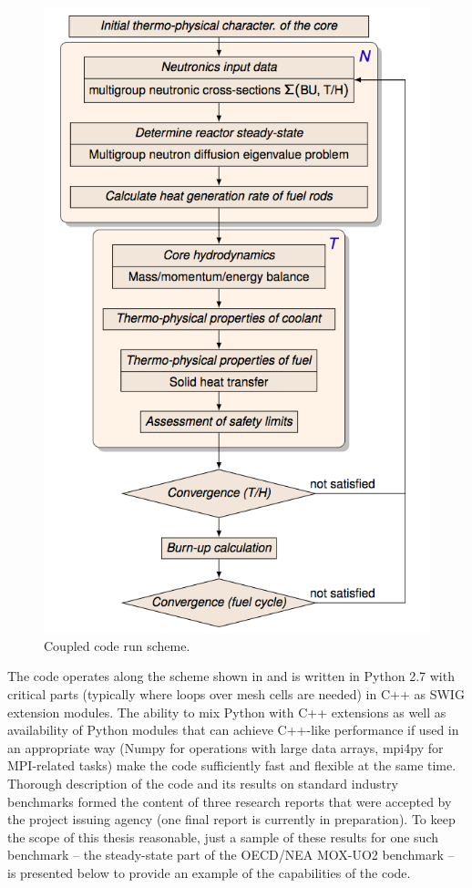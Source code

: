 \begin{figure}[p]
\centering
  \includegraphics[scale=.55]{schema}
  \caption[Coupled code run scheme]{Coupled code run scheme.}
  \label{fig:scheme}
\end{figure}

The code operates along the scheme shown in  and is written in Python 2.7
with critical parts (typically where loops over mesh cells are needed) in C++ as SWIG extension modules. The
ability to mix Python with C++ extensions as well as availability of Python modules that can achieve C++-like
performance if used in an appropriate way (Numpy for operations with large data arrays, mpi4py for MPI-related tasks)
make the code sufficiently fast and flexible at the same time.
Thorough description of the code and its 
results on standard industry benchmarks formed the content of three research reports 
that were accepted by the project issuing agency (one final report is currently in preparation). To keep the scope of
this thesis reasonable, just a sample of these results for one such benchmark -- the steady-state part of the OECD/NEA
MOX-UO2 benchmark \cite{mox-bench} -- is presented below to provide an example of the capabilities of the code. 

